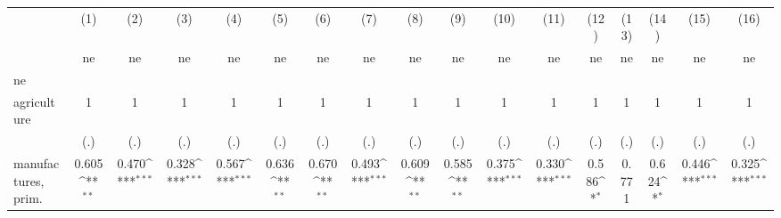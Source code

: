 {
\def\sym#1{\ifmmode^{#1}\else\(^{#1}\)\fi}
\begin{tabular}{l*{16}{c}}
\hline\hline
                    &\multicolumn{1}{c}{(1)}&\multicolumn{1}{c}{(2)}&\multicolumn{1}{c}{(3)}&\multicolumn{1}{c}{(4)}&\multicolumn{1}{c}{(5)}&\multicolumn{1}{c}{(6)}&\multicolumn{1}{c}{(7)}&\multicolumn{1}{c}{(8)}&\multicolumn{1}{c}{(9)}&\multicolumn{1}{c}{(10)}&\multicolumn{1}{c}{(11)}&\multicolumn{1}{c}{(12)}&\multicolumn{1}{c}{(13)}&\multicolumn{1}{c}{(14)}&\multicolumn{1}{c}{(15)}&\multicolumn{1}{c}{(16)}\\
                    &\multicolumn{1}{c}{ne}&\multicolumn{1}{c}{ne}&\multicolumn{1}{c}{ne}&\multicolumn{1}{c}{ne}&\multicolumn{1}{c}{ne}&\multicolumn{1}{c}{ne}&\multicolumn{1}{c}{ne}&\multicolumn{1}{c}{ne}&\multicolumn{1}{c}{ne}&\multicolumn{1}{c}{ne}&\multicolumn{1}{c}{ne}&\multicolumn{1}{c}{ne}&\multicolumn{1}{c}{ne}&\multicolumn{1}{c}{ne}&\multicolumn{1}{c}{ne}&\multicolumn{1}{c}{ne}\\
\hline
ne                  &                     &                     &                     &                     &                     &                     &                     &                     &                     &                     &                     &                     &                     &                     &                     &                     \\
agriculture         &           1         &           1         &           1         &           1         &           1         &           1         &           1         &           1         &           1         &           1         &           1         &           1         &           1         &           1         &           1         &           1         \\
                    &         (.)         &         (.)         &         (.)         &         (.)         &         (.)         &         (.)         &         (.)         &         (.)         &         (.)         &         (.)         &         (.)         &         (.)         &         (.)         &         (.)         &         (.)         &         (.)         \\
[1em]
manufactures, prim. &       0.605\sym{**} &       0.470\sym{***}&       0.328\sym{***}&       0.567\sym{***}&       0.636\sym{**} &       0.670\sym{**} &       0.493\sym{***}&       0.609\sym{**} &       0.585\sym{**} &       0.375\sym{***}&       0.330\sym{***}&       0.586\sym{*}  &       0.771         &       0.624\sym{*}  &       0.446\sym{***}&       0.325\sym{***}\\

\end{tabular}}
